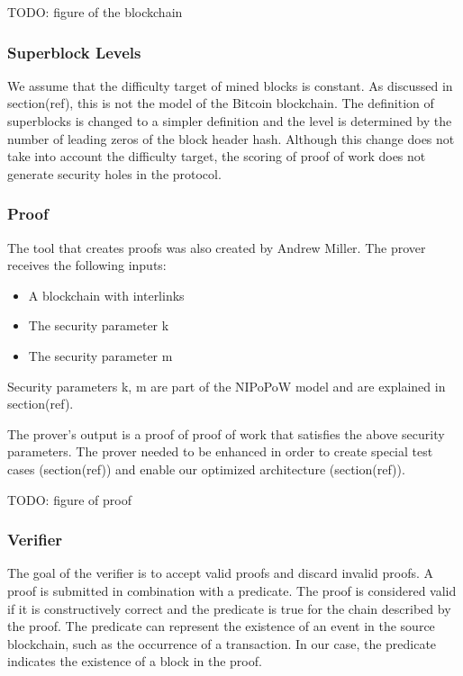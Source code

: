 \documentclass{article}
\begin{document}
  TODO: figure of the blockchain

  \subsubsection{Superblock Levels}

  We assume that the difficulty target of mined blocks is constant. As
  discussed in section(ref), this is not the model of the Bitcoin
  blockchain. The definition of superblocks is changed to a simpler
  definition and the level is determined by the number of leading zeros
  of the block header hash. Although this change does not take into
  account the difficulty target, the scoring of proof of work does not
  generate security holes in the protocol.

  \subsubsection{Proof}

  The tool that creates proofs was also created by Andrew Miller. The
  prover receives the following inputs:

  \begin{itemize}
  \item
    A blockchain with interlinks
  \item
    The security parameter k
  \item
    The security parameter m
  \end{itemize}

  Security parameters k, m are part of the NIPoPoW model and are
  explained in section(ref).

  The prover’s output is a proof of proof of work that satisfies the
  above security parameters. The prover needed to be enhanced in order
  to create special test cases (section(ref)) and enable our optimized
  architecture (section(ref)).

  TODO: figure of proof

  \subsubsection{Verifier}

  The goal of the verifier is to accept valid proofs and discard invalid
  proofs. A proof is submitted in combination with a predicate. The
  proof is considered valid if it is constructively correct and the
  predicate is true for the chain described by the proof. The predicate
  can represent the existence of an event in the source blockchain, such
  as the occurrence of a transaction. In our case, the predicate
  indicates the existence of a block in the proof.
\end{document}
